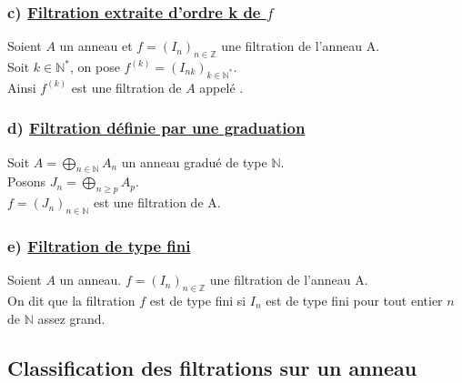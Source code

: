 \subsubsection{c) \underline{Filtration extraite d'ordre k de $f$}}
\begin{madefinition}
	Soient $A$ un anneau et $f = (I_n)_{n\in \mathbb{Z}}$ une filtration de l'anneau A.\\
	Soit $k \in \mathbb{N}^{*}$, on pose $f^{(k)} = (I_{nk})_{k\in \mathbb{N}^*}$.\\ 
	Ainsi $f^{(k)}$ est une filtration de $A$ appelé .
\end{madefinition}

\subsubsection{d) \underline{Filtration définie par une graduation}}
\begin{madefinition}
	Soit $A = \displaystyle \bigoplus_{n \in \mathbb{N}}{A_n}$ un anneau gradué de type $\mathbb{N}$.\\ Posons $J_n = \displaystyle \bigoplus_{n \geqslant p }{A_p}$.\\
	$f=(J_n)_{n \in \mathbb{N}}$ est une filtration de A. 
\end{madefinition}
\subsubsection{e) \underline{Filtration de type fini}}
\begin{madefinition}
	Soient $A$ un anneau. $f = (I_n)_{n\in \mathbb{Z}}$ une filtration de l'anneau A.\\
	On dit que la filtration $f$ est de type fini si $I_n$ est de type fini pour tout entier $n$ de $\mathbb{N}$ assez grand.
\end{madefinition}

\subsection{Classification des filtrations sur un anneau}
